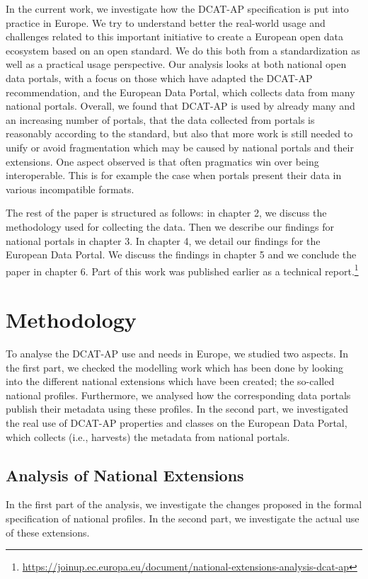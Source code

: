 \documentclass[<options>]{elsarticle}
\begin{document}
In the current work, we investigate how the DCAT-AP specification is put into practice in Europe. We try to understand better the real-world usage and challenges related to this important initiative to create a European open data ecosystem based on an open standard. We do this both from a standardization as well as a practical usage perspective. Our analysis looks at both national open data portals, with a focus on those which have adapted the DCAT-AP recommendation, and the European Data Portal, which collects data from many national portals. Overall, we found that DCAT-AP is used by already many and an increasing number of portals, that the data collected from portals is reasonably according to the standard, but also that more work is still needed to unify or avoid fragmentation which may be caused by national portals and their extensions. One aspect observed is that often pragmatics win over being interoperable. This is for example the case when portals present their data in various incompatible formats.

The rest of the paper is structured as follows: in chapter 2, we discuss the methodology used for collecting the data. Then we describe our findings for national portals in chapter 3. In chapter 4, we detail our findings for the European Data Portal.  We discuss the findings in chapter 5 and we conclude the paper in chapter 6. Part of this work was published earlier as a technical report.\footnote{\href{https://joinup.ec.europa.eu/document/national-extensions-analysis-dcat-ap}{https://joinup.ec.europa.eu/document/national-extensions-analysis-dcat-ap}}

\section{Methodology}
To analyse the DCAT-AP use and needs in Europe, we studied two aspects. In the first part, we checked the modelling work which has been done by looking into the different national extensions which have been created; the so-called national profiles. Furthermore, we analysed how the corresponding data portals publish their metadata using these profiles. In the second part, we investigated the real use of DCAT-AP properties and classes on the European Data Portal, which collects (i.e., harvests) the metadata from national portals.

\subsection{Analysis of National Extensions}
In the first part of the analysis, we investigate the changes proposed in the formal specification of national profiles. In the second part, we investigate the actual use of these extensions.
\end{document}
